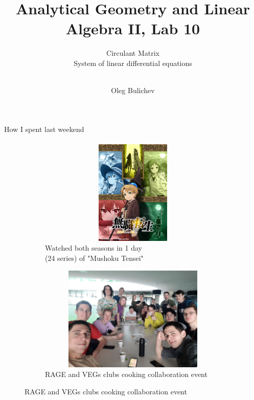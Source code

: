 \documentclass[aspectratio=169]{beamer}
\title[AGLA2]{Analytical Geometry and Linear Algebra II, Lab 10} %
\subtitle{Circulant Matrix \\ System of linear differential equations \\ \ 
         } %
\author{Oleg Bulichev}
\newcommand{\fbckg}[1]{\usebackgroundtemplate{\texttt{[image: \#1]}}}%
\begin{document}
\setlength{\abovedisplayskip}{0pt}
\setlength{\belowdisplayskip}{0pt}
\setlength{\abovedisplayshortskip}{0pt}
\setlength{\belowdisplayshortskip}{0pt}

\fbckg{fibeamer/figs/title_page.png}

\fbckg{fibeamer/figs/common.png}

\begin{frame}[c]{How I spent last weekend}
    \framesubtitle{}
    \begin{figure}[H]
        \begin{subfigure}{0.49\textwidth}
            \centering\includegraphics[height=5cm,width=1\textwidth,keepaspectratio]{mushoku_tensei.jpg}
            \caption*{\Large Watched both seasons in 1 day \\ (24 series) of "Mushoku Tensei"}
        \end{subfigure}
        \hfill
        \begin{subfigure}{0.49\textwidth}
            \centering\includegraphics[height=5cm,width=1\textwidth,keepaspectratio]{rage_vegs.jpg}
            \caption*{\Large RAGE and VEGs clubs cooking collaboration event}
        \end{subfigure}
        
    \end{figure}
\end{frame}
\end{document}
